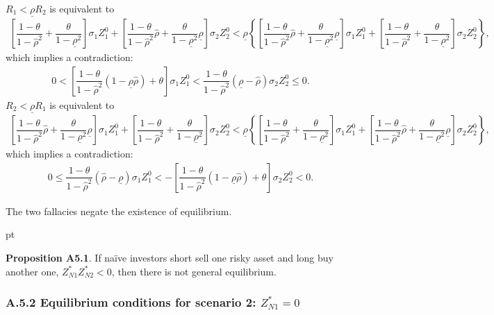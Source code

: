 \documentclass[10pt]{article}
\begin{document}
$ R_1 < \underline{\rho} R_2 $ is equivalent to 
{\footnotesize \begin{eqnarray*}
\left[ \dfrac{1 - \theta}{1 - {\hat \rho}^2} + \dfrac{\theta}{1 - \underline{\rho}^2} \right] \sigma_1 Z_1^0 + \left[ \dfrac{1 - \theta}{1 - {\hat \rho}^2} {\hat \rho} + \dfrac{\theta}{1 - \underline{\rho}^2} \underline{\rho} \right] \sigma_2 Z_2^0 < \underline{\rho} \left\{ \left[ \dfrac{1 - \theta}{1 - {\hat \rho}^2} {\hat \rho} + \dfrac{\theta}{1 - \underline{\rho}^2} \underline{\rho} \right] \sigma_1 Z_1^0 + \left[ \dfrac{1 - \theta}{1 - {\hat \rho}^2} + \dfrac{\theta}{1 - \underline{\rho}^2} \right] \sigma_2 Z_2^0 \right\},
\end{eqnarray*}}
which implies a contradiction:
\begin{eqnarray*}
0 < \left[ \dfrac{1 - \theta}{1 - {\hat \rho}^2} (1 - \underline{\rho} {\hat \rho}) + \theta \right] \sigma_1 Z_1^0 < \dfrac{1 - \theta}{1 - {\hat \rho}^2} (\underline{\rho} - {\hat \rho}) \sigma_2 Z_2^0 \leqslant 0.
\end{eqnarray*}
$ R_2 < \underline{\rho} R_1 $ is equivalent to 
{\footnotesize \begin{eqnarray*}
\left[ \dfrac{1 - \theta}{1 - {\hat \rho}^2} {\hat \rho} + \dfrac{\theta}{1 - \underline{\rho}^2} \underline{\rho} \right] \sigma_1 Z_1^0 + \left[ \dfrac{1 - \theta}{1 - {\hat \rho}^2} + \dfrac{\theta}{1 - \underline{\rho}^2} \right] \sigma_2 Z_2^0 < \underline{\rho} \left\{ \left[ \dfrac{1 - \theta}{1 - {\hat \rho}^2} + \dfrac{\theta}{1 - \underline{\rho}^2} \right] \sigma_1 Z_1^0 + \left[ \dfrac{1 - \theta}{1 - {\hat \rho}^2} {\hat \rho} + \dfrac{\theta}{1 - \underline{\rho}^2} \underline{\rho} \right] \sigma_2 Z_2^0 \right\},
\end{eqnarray*}}
which implies a contradiction:
\begin{eqnarray*}
0 \leqslant \dfrac{1 - \theta}{1 - {\hat \rho}^2} ({\hat \rho} - \underline{\rho}) \sigma_1 Z_1^0 < - \left[ \dfrac{1 - \theta}{1 - {\hat \rho}^2} (1 - \underline{\rho} {\hat \rho}) + \theta \right] \sigma_2 Z_2^0 < 0.
\end{eqnarray*}

The two fallacies negate the existence of equilibrium.

 pt

{\bf Proposition A5.1}. If na\"ive investors short sell one risky asset and long buy another one, $ Z_{N 1}^* Z_{N 2}^* < 0 $, then there is not general equilibrium.

\subsubsection*{A.5.2 \quad Equilibrium conditions for scenario 2: $ Z_{N 1}^* = 0 $}
\end{document}
